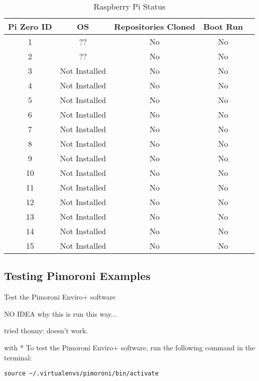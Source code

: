 \documentclass{article}
\begin{document}
\begin{table}[h!]
\begin{center}
\begin{tabular}{|c|c|c|c|c|}
\hline
\textbf{Pi Zero ID} & \textbf{OS} & \textbf{Repositories Cloned } & \textbf{Boot Run} \\
\hline
1 & ?? & No & No \\
2 & ?? & No & No \\
3 & Not Installed & No & No \\
4 & Not Installed & No & No \\
5 & Not Installed & No & No \\
6 & Not Installed & No & No \\
7 & Not Installed & No & No \\
8 & Not Installed & No & No \\
9 & Not Installed & No & No \\

10 & Not Installed & No & No \\
11 & Not Installed & No & No \\
12 & Not Installed & No & No \\
13 & Not Installed & No & No \\
14 & Not Installed & No & No \\
15 & Not Installed & No & No \\

\hline
\end{tabular}
\end{center}
\caption{Raspberry Pi Status}
\label{table:1}
\end{table}




\subsection{Testing Pimoroni Examples}

Test the Pimoroni Enviro+ software

NO IDEA why this is run this way...

tried thonny: doesn't work.

with 
* To test the Pimoroni Enviro+ software, run the following command in the terminal:

\begin{verbatim}
source ~/.virtualenvs/pimoroni/bin/activate
\end{verbatim}
\end{document}
